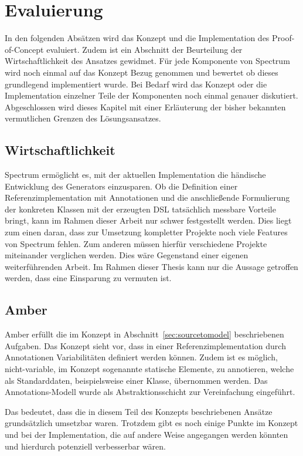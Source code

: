 \documentclass[12pt,oneside,a4paper,parskip]{scrbook}
\begin{document}
\chapter{Evaluierung}

In den folgenden Absätzen wird das Konzept und die Implementation des Proof-of-Concept evaluiert. Zudem ist ein Abschnitt der Beurteilung der Wirtschaftlichkeit des Ansatzes gewidmet. Für jede Komponente von Spectrum wird noch einmal auf das Konzept Bezug genommen und bewertet ob dieses grundlegend implementiert wurde. Bei Bedarf wird das Konzept oder die Implementation einzelner Teile der Komponenten noch einmal genauer diskutiert. Abgeschlossen wird dieses Kapitel mit einer Erläuterung der bisher bekannten vermutlichen Grenzen des Lösungsansatzes.

\section{Wirtschaftlichkeit}

Spectrum ermöglicht es, mit der aktuellen Implementation die händische Entwicklung des Generators einzusparen. Ob die Definition einer Referenzimplementation mit Annotationen und die anschließende Formulierung der konkreten Klassen mit der erzeugten DSL tatsächlich messbare Vorteile bringt, kann im Rahmen dieser Arbeit nur schwer festgestellt werden. Dies liegt zum einen daran, dass zur Umsetzung kompletter Projekte noch viele Features von Spectrum fehlen. Zum anderen müssen hierfür verschiedene Projekte miteinander verglichen werden. Dies wäre Gegenstand einer eigenen weiterführenden Arbeit. Im Rahmen dieser Thesis kann nur die Aussage getroffen werden, dass eine Einsparung zu vermuten ist.

\section{Amber}

Amber erfüllt die im Konzept in Abschnitt~\ref{sec:sourcetomodel} beschriebenen Aufgaben. Das Konzept sieht vor, dass in einer Referenzimplementation durch Annotationen Variabilitäten definiert werden können. Zudem ist es möglich, nicht-variable, im Konzept sogenannte statische Elemente, zu annotieren, welche als Standarddaten, beispielsweise einer Klasse, übernommen werden. Das Annotations-Modell wurde als Abstraktionsschicht zur Vereinfachung eingeführt.

Das bedeutet, dass die in diesem Teil des Konzepts beschriebenen Ansätze grundsätzlich umsetzbar waren. Trotzdem gibt es noch einige Punkte im Konzept und bei der Implementation, die auf andere Weise angegangen werden könnten und hierdurch potenziell verbesserbar wären.
\end{document}
